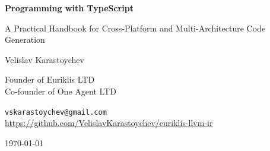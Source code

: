 \newpage
\thispagestyle{empty}
\begin{center}
    \vspace*{2cm}

    {\Large\bfseries Programming   with TypeScript\par}

    \vspace{0.5cm}

    {\normalsize A Practical Handbook for Cross-Platform and Multi-Architecture Code Generation\par}

    \vspace{1cm}

    {\Large \AuthorBadge\hspace{0.5cm}Velislav Karastoychev\par}

    \vspace{1.2cm}

    {\large
    Founder of Euriklis LTD\\
    Co-founder of One Agent LTD\par}

    \vspace{2cm}

    {\large
    \texttt{vskarastoychev@gmail.com}\\[0.5cm]
    \url{https://github.com/VelislavKarastoychev/euriklis-llvm-ir}\par}

    \vspace{2cm}

    {\large \today\par}

\end{center}

